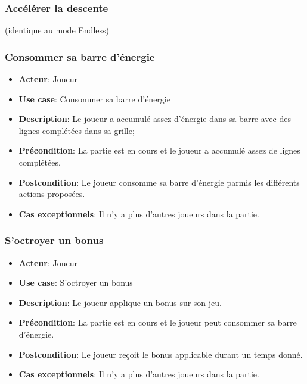 \documentclass{article}
\begin{document}
\subsubsection*{Accélérer la descente} (identique au mode Endless)

\subsubsection*{Consommer sa barre d'énergie}
\begin{itemize}
    \item \textbf{Acteur}: Joueur
    \item \textbf{Use case}: Consommer sa barre d'énergie
    \item \textbf{Description}: Le joueur a accumulé assez d'énergie dans sa barre avec des lignes complétées dans sa grille;
    \item \textbf{Précondition}: La partie est en cours et le joueur a accumulé assez de lignes complétées.
    \item \textbf{Postcondition}: Le joueur consomme sa barre d'énergie parmis les différents actions proposées.
    \item \textbf{Cas exceptionnels}: Il n'y a plus d'autres joueurs dans la partie.
\end{itemize}

\subsubsection*{S'octroyer un bonus}
\begin{itemize}
    \item \textbf{Acteur}: Joueur
    \item \textbf{Use case}: S'octroyer un bonus
    \item \textbf{Description}: Le joueur applique un bonus sur son jeu.
    \item \textbf{Précondition}: La partie est en cours et le joueur peut consommer sa barre d'énergie.
    \item \textbf{Postcondition}: Le joueur reçoit le bonus applicable durant un temps donné. 
    \item \textbf{Cas exceptionnels}: Il n'y a plus d'autres joueurs dans la partie.
\end{itemize}
\end{document}

